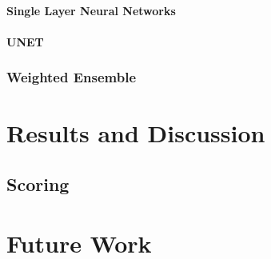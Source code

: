\documentclass{article}
\begin{document}
\paragraph{Single Layer Neural Networks}
\paragraph{UNET}

\subsubsection{Weighted Ensemble}

\section{Results and Discussion}
\subsection{Scoring}

\section{Future Work}
\end{document}
